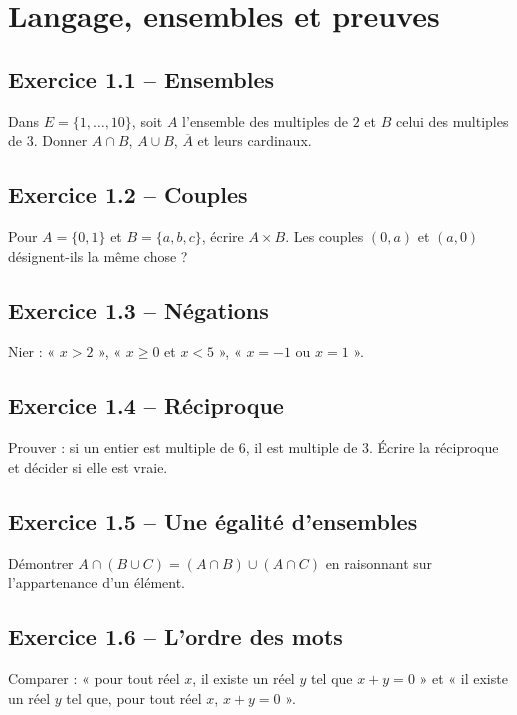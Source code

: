 \chapter{Langage, ensembles et preuves}
\section*{Exercice 1.1 -- Ensembles}
Dans $E=\{1,\ldots,10\}$, soit $A$ l'ensemble des multiples de $2$ et $B$ celui des multiples de $3$. Donner $A\cap B$, $A\cup B$, $\overline A$ et leurs cardinaux.

\section*{Exercice 1.2 -- Couples}
Pour $A=\{0,1\}$ et $B=\{a,b,c\}$, écrire $A\times B$. Les couples $(0,a)$ et $(a,0)$ désignent-ils la même chose ?

\section*{Exercice 1.3 -- Négations}
Nier : « $x>2$ », « $x\geq0$ et $x<5$ », « $x=-1$ ou $x=1$ ».

\section*{Exercice 1.4 -- Réciproque}
Prouver : si un entier est multiple de $6$, il est multiple de $3$. Écrire la réciproque et décider si elle est vraie.

\section*{Exercice 1.5 -- Une égalité d'ensembles}
Démontrer $A\cap(B\cup C)=(A\cap B)\cup(A\cap C)$ en raisonnant sur l'appartenance d'un élément.

\section*{Exercice 1.6 -- L'ordre des mots}
Comparer : « pour tout réel $x$, il existe un réel $y$ tel que $x+y=0$ » et « il existe un réel $y$ tel que, pour tout réel $x$, $x+y=0$ ».
